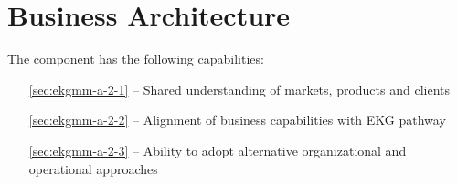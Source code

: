 \chapter{Business Architecture}\label{ch:ekgmm-a-2} %

The  component has the following capabilities:

\begin{itemize}[leftmargin=.5in]
  \item [\ref{sec:ekgmm-a-2-1}]  -- Shared understanding of markets, products and clients
  \item [\ref{sec:ekgmm-a-2-2}]  -- Alignment of business capabilities with EKG pathway
  \item [\ref{sec:ekgmm-a-2-3}]  -- Ability to adopt alternative organizational and operational approaches
\end{itemize}






